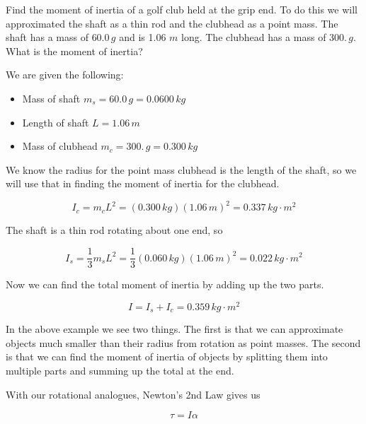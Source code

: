 \documentclass[12pt]{book}
\begin{document}
\begin{exampleblock}

Find the moment of inertia of a golf club held at the grip end. To do this we will approximated the shaft as a thin rod and the clubhead as a point mass. The shaft has a mass of $60.0 \, g$ and is 1.06 $m$ long. The clubhead has a mass of $300. \, g$. What is the moment of inertia?

\hspace{10pt}

We are given the following:

\begin{itemize}
\item Mass of shaft $m_s = 60.0 \, g = 0.0600 \, kg$
\item Length of shaft $L = 1.06 \, m$
\item Mass of clubhead $m_c = 300. \, g = 0.300 \, kg$
\end{itemize}

We know the radius for the point mass clubhead is the length of the shaft, so we will use that in finding the moment of inertia for the clubhead. 

\begin{equation}
I_c = m_c L^2 = (0.300 \, kg) (1.06 \, m)^2 = 0.337 \, kg \cdot m^2
\end{equation}

The shaft is a thin rod rotating about one end, so

\begin{equation}
I_s = \frac{1}{3} m_s L^2 = \frac{1}{3} (0.060 \, kg) (1.06 \, m)^2 = 0.022 \, kg \cdot m^2
\end{equation}

Now we can find the total moment of inertia by adding up the two parts.

\begin{equation}
I = I_s + I_c = 0.359 \, kg \cdot m^2
\end{equation}

\end{exampleblock}

In the above example we see two things. The first is that we can approximate objects much smaller than their radius from rotation as point masses. The second is that we can find the moment of inertia of objects by splitting them into multiple parts and summing up the total at the end.

With our rotational analogues, Newton's 2nd Law gives us

\begin{equation}
\tau = I \alpha
\end{equation}
\end{document}
